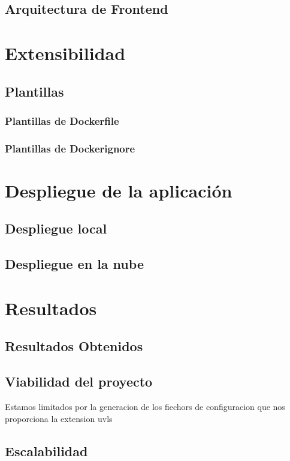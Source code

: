 \documentclass[12pt, a4paper, twoside]{article}
\begin{document}
\subsection{Arquitectura de Frontend}



\section{Extensibilidad}
\subsection{Plantillas}
\subsubsection{Plantillas de Dockerfile}
\subsubsection{Plantillas de Dockerignore}


\section{Despliegue de la aplicación  }
\subsection{ Despliegue local }
\subsection{ Despliegue en la nube }


\section{Resultados}
\subsection{Resultados Obtenidos}
\subsection{Viabilidad del proyecto}
Estamos limitados por la generacion de los fiechors de configuracion que nos proporciona la extension uvls
\subsection{Escalabilidad}
\end{document}

